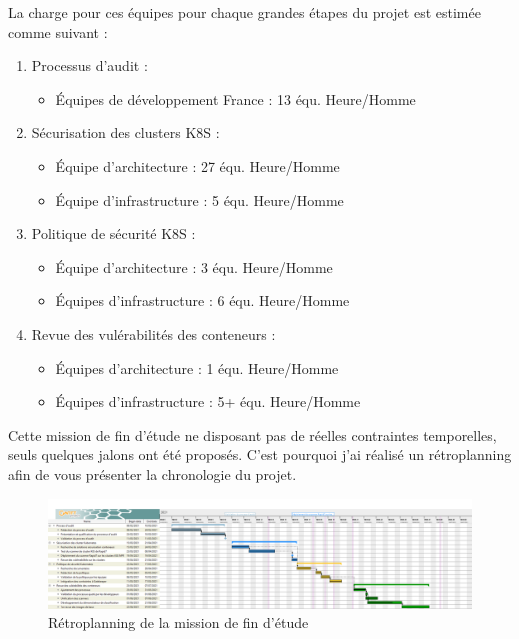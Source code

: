 \newpage

La charge pour ces équipes pour chaque grandes étapes du projet est estimée comme suivant :
\begin{enumerate}
    \item Processus d'audit :
    \begin{itemize}
        \renewcommand{\labelitemi}{•}
        \item Équipes de développement France : 13 équ. Heure/Homme
    \end{itemize}
    \item Sécurisation des clusters \ac{K8S} :
    \begin{itemize}
        \renewcommand{\labelitemi}{•}
        \item Équipe d'architecture : 27 équ. Heure/Homme
        \item Équipe d'infrastructure : 5 équ. Heure/Homme
    \end{itemize}
    \item Politique de sécurité \ac{K8S} :
    \begin{itemize}
        \renewcommand{\labelitemi}{•}
        \item Équipe d'architecture : 3 équ. Heure/Homme
        \item Équipes d'infrastructure : 6 équ. Heure/Homme
    \end{itemize}
    \item Revue des vulérabilités des conteneurs :
    \begin{itemize}
        \renewcommand{\labelitemi}{•}
        \item Équipes d'architecture : 1 équ. Heure/Homme
        \item Équipes d'infrastructure : 5+ équ. Heure/Homme
    \end{itemize}
\end{enumerate}

Cette mission de fin d'étude ne disposant pas de réelles contraintes temporelles, seuls quelques jalons ont été proposés.
C'est pourquoi j'ai réalisé un rétroplanning afin de vous présenter la chronologie du projet.

\begin{figure}[h]
    \centering
    \includegraphics[width=\linewidth]{resources/img/retroplanning.png}
    \caption{Rétroplanning de la mission de fin d'étude}
\end{figure}

